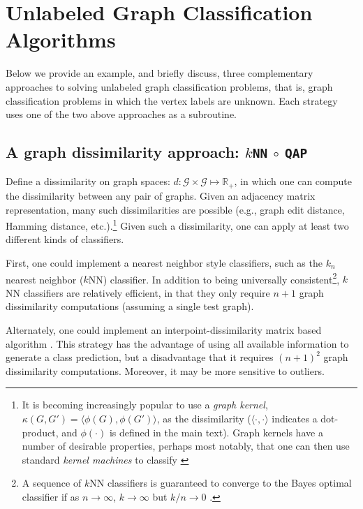 \documentclass{article} %
\providecommand{\mc}[1]{\mathcal{#1}}
\newcommand{\Real}{\mathbb{R}}
\newcommand{\conv}{\rightarrow}
\newcommand{\qap}{\texttt{QAP} }
\begin{document}


\section{Unlabeled Graph Classification Algorithms} %
\label{sec:algorithms}

Below we provide an example, and briefly discuss, three complementary approaches to solving unlabeled graph classification problems, that is, graph classification problems in which the vertex labels are unknown.  Each strategy uses one of the two above approaches as a subroutine.

\subsection{A graph dissimilarity approach: \texttt{$k$NN} $\circ$ \qap} %
\label{ssub:_k_nn_circ_qap}

Define a dissimilarity on graph spaces: $d: \mc{G} \times \mc{G} \mapsto \Real_+$, in which one can compute the dissimilarity between any pair of graphs. Given an adjacency matrix representation, many such dissimilarities are possible (e.g., graph edit distance, Hamming distance, etc.).\footnote{It is becoming increasingly popular to use a \emph{graph kernel}, $\kappa(G,G')=\langle \phi(G), \phi(G') \rangle$, as the dissimilarity \cite{Bunke2011} ($\langle \cdot, \cdot \rangle$ indicates a dot-product, and $\phi(\cdot)$ is defined in the main text).  Graph kernels have a number of desirable properties, perhaps most notably, that one can then use standard \emph{kernel machines} to classify \cite{Vapnik1998}}	Given such a dissimilarity, one can apply at least two different kinds of classifiers.


First, one could implement a nearest neighbor style classifiers, such as the $k_n$ nearest neighbor ($k$NN) classifier.  In addition to being universally consistent\footnote{A sequence of $k$NN classifiers is guaranteed to converge to the Bayes optimal classifier  if  as $n \conv \infty$, $k \conv \infty$ but $k/n \conv 0$ \cite{Devroye1997}.}, $k$NN classifiers are relatively efficient, in that they only require $n+1$ graph dissimilarity computations (assuming a single test graph).  

Alternately, one could implement an interpoint-dissimilarity matrix based algorithm \cite{Duin2011}. This strategy has the advantage of using all available information to generate a class prediction, but a disadvantage that it requires $(n+1)^2$ graph dissimilarity computations. Moreover, it may be more sensitive to outliers.
\end{document}
